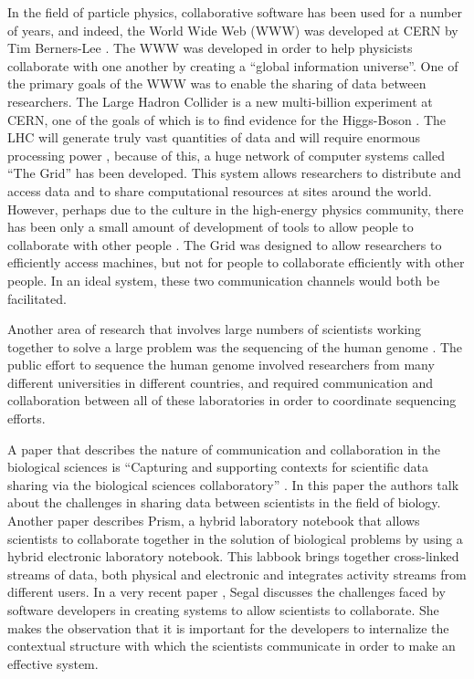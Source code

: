 \documentclass[12pt,oneside]{book}
\begin{document}
In the field of particle physics, collaborative software has been used
for a number of years, and indeed, the World Wide Web (WWW) was
developed at CERN by Tim Berners-Lee \cite{bernerslee92}.  The WWW was
developed in order to help physicists collaborate with one another by
creating a ``global information universe''.  One of the primary goals
of the WWW was to enable the sharing of data between researchers.  The
Large Hadron Collider is a new multi-billion experiment at CERN, one
of the goals of which is to find evidence for the Higgs-Boson
\cite{wells09}.  The LHC will generate truly vast quantities of data
and will require enormous processing power \cite{wiebalck03}, because
of this, a huge network of computer systems called ``The Grid'' has
been developed.  This system allows researchers to distribute and
access data and to share computational resources at sites around the
world.  However, perhaps due to the culture in the high-energy physics
community, there has been only a small amount of development of tools
\cite{birnholtz03} to allow people to collaborate with other people
\cite{horn04}.  The Grid was designed to allow researchers to
efficiently access machines, but not for people to collaborate
efficiently with other people.  In an ideal system, these two
communication channels would both be facilitated.

Another area of research that involves large numbers of scientists
working together to solve a large problem was the sequencing of the
human genome \cite{venter01}.  The public effort to sequence the human
genome involved researchers from many different universities in
different countries, and required communication and collaboration
between all of these laboratories in order to coordinate sequencing
efforts.

A paper that describes the nature of communication and collaboration
in the biological sciences is ``Capturing and supporting contexts for
scientific data sharing via the biological sciences collaboratory''
\cite{chin04}.  In this paper the authors talk about the challenges in
sharing data between scientists in the field of biology.  Another
paper \cite{tabard08} describes Prism, a hybrid laboratory notebook
that allows scientists to collaborate together in the solution of
biological problems by using a hybrid electronic laboratory notebook.
This labbook brings together cross-linked streams of data, both
physical and electronic and integrates activity streams from different
users.  In a very recent paper \cite{segal09}, Segal discusses the
challenges faced by software developers in creating systems to allow
scientists to collaborate.  She makes the observation that it is
important for the developers to internalize the contextual structure
with which the scientists communicate in order to make an effective
system.
\end{document}
